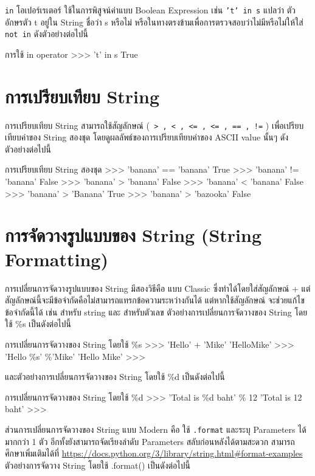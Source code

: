 \texttt{in} โอเปอร์เรเตอร์ ใช้ในการพิสูจน์ค่าแบบ Boolean Expression เช่น \texttt{'t' in s} แปลว่า ตัวอักษรตัว t อยู่ใน String ชื่อว่า s หรือไม่ หรือในทางตรงข้ามเพื่อการตรวจสอบว่าไม่มีหรือไม่ให้ใส่ \texttt{not in} ดังตัวอย่างต่อไปนี้ 

\begin{codelist}{การใช้ in operator}{}
>>> 't' in s
True
\end{codelist}

\section{การเปรียบเทียบ String}

การเปรียบเทียบ String สามารถใช้สัญลักษณ์  (\texttt{ > , < , <= , <= , == , !=}  ) เพื่อเปรียบเทียบค่าของ String สองชุด โดยดูผลลัพธ์ของการเปรียบเทียบค่าของ ASCII value นั้นๆ ดังตัวอย่างต่อไปนี้

\begin{codelist}{การเปรียบเทียบ String สองชุด}{}
>>> 'banana' == 'banana'
True
>>> 'banana' !=  'banana'
False
>>>  'banana' >  'banana'
False
>>>  'banana' <  'banana'
False
>>>  'banana' >  'Banana'
True
>>>  'banana' >  'bazooka'
False
\end{codelist}


\section{การจัดวางรูปแบบของ String (String Formatting)}

การเปลี่ยนการจัดวางรูปแบบของ String มีสองวิธีคือ แบบ Classic ซึ่งทำได้โดยใส่สัญลักษณ์ + แต่สัญลักษณ์นี้จะมีข้อจำกัดคือไม่สามารถแทรกข้อความระหว่างกันได้ แต่หากใช้สัญลักษณ์ \pyinline{\%} จะช่วยแก้ไขข้อจำกัดนี้ได้ เช่น  สำหรับ string และ  สำหรับตัวเลข ตัวอย่างการเปลี่ยนการจัดวางของ String โดยใช้ \%s เป็นดังต่อไปนี้

\begin{codelist}{การเปลี่ยนการจัดวางของ String โดยใช้ \%s}{}
>>> 'Hello' + 'Mike'
'HelloMike'
>>> 'Hello \%s' \%'Mike'
'Hello Mike'
>>>
\end{codelist}

และตัวอย่างการเปลี่ยนการจัดวางของ String โดยใช้ \%d เป็นดังต่อไปนี้

\begin{codelist}{การเปลี่ยนการจัดวางของ String โดยใช้ \%d}{}
>>> 'Total is \%d baht' \% 12
'Total is 12 baht'
>>>
\end{codelist}

ส่วนการเปลี่ยนการจัดวางของ String แบบ Modern คือ ใช้ \texttt{.format} และระบุ Parameters ได้มากกว่า 1 ตัว อีกทั้งยังสามารถจัดเรียงลำดับ Parameters สลับก่อนหลังได้ตามสะดวก สามารถศึกษาเพิ่มเติมได้ที่ \url{https://docs.python.org/3/library/string.html\#format-examples} ตัวอย่างการจัดวาง String โดยใช้ .format() เป็นดังต่อไปนี้

